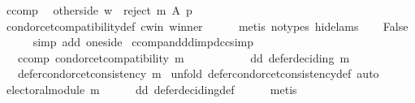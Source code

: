 \begin{isabellebody}
\ ccomp\ \isamarkupfalse%
\ other{\isacharunderscore}{\kern0pt}side{\isacharcolon}{\kern0pt}\ {\isachardoublequoteopen}w\ {\isasymnotin}\ reject\ m\ A\ p{\isachardoublequoteclose}\isanewline
\ \ \ \ \isamarkupfalse%
\ condorcet{\isacharunderscore}{\kern0pt}compatibility{\isacharunderscore}{\kern0pt}def\ c{\isacharunderscore}{\kern0pt}win\ winner\isanewline
\ \ \ \ \isamarkupfalse%
\ {\isacharparenleft}{\kern0pt}metis\ {\isacharparenleft}{\kern0pt}no{\isacharunderscore}{\kern0pt}types{\isacharcomma}{\kern0pt}\ hide{\isacharunderscore}{\kern0pt}lams{\isacharparenright}{\kern0pt}{\isacharparenright}{\kern0pt}\isanewline
\ \ \isamarkupfalse%
\ False\isanewline
\ \ \ \ \isamarkupfalse%
\ {\isacharparenleft}{\kern0pt}simp\ add{\isacharcolon}{\kern0pt}\ one{\isacharunderscore}{\kern0pt}side{\isacharparenright}{\kern0pt}\isanewline
{}\isamarkupfalse%
%
\endisatagproof
{\isafoldproof}%
%
\isadelimproof
\isanewline
%
\endisadelimproof
\isanewline
{}\isamarkupfalse%
\ ccomp{\isacharunderscore}{\kern0pt}and{\isacharunderscore}{\kern0pt}dd{\isacharunderscore}{\kern0pt}imp{\isacharunderscore}{\kern0pt}dcc{\isacharbrackleft}{\kern0pt}simp{\isacharbrackright}{\kern0pt}{\isacharcolon}{\kern0pt}\isanewline
\ \ \ ccomp{\isacharcolon}{\kern0pt}\ {\isachardoublequoteopen}condorcet{\isacharunderscore}{\kern0pt}compatibility\ m{\isachardoublequoteclose}\ \isanewline
\ \ \ \ \ \ \ \ \ \ dd{\isacharcolon}{\kern0pt}\ {\isachardoublequoteopen}defer{\isacharunderscore}{\kern0pt}deciding\ m{\isachardoublequoteclose}\isanewline
\ \ \ {\isachardoublequoteopen}defer{\isacharunderscore}{\kern0pt}condorcet{\isacharunderscore}{\kern0pt}consistency\ m{\isachardoublequoteclose}\isanewline
%
\isadelimproof
%
\endisadelimproof
%
\isatagproof
{}\isamarkupfalse%
\ {\isacharparenleft}{\kern0pt}unfold\ defer{\isacharunderscore}{\kern0pt}condorcet{\isacharunderscore}{\kern0pt}consistency{\isacharunderscore}{\kern0pt}def{\isacharcomma}{\kern0pt}\ auto{\isacharparenright}{\kern0pt}\isanewline
\ \ \isamarkupfalse%
\ {\isachardoublequoteopen}electoral{\isacharunderscore}{\kern0pt}module\ m{\isachardoublequoteclose}\isanewline
\ \ \ \ \isamarkupfalse%
\ dd\ defer{\isacharunderscore}{\kern0pt}deciding{\isacharunderscore}{\kern0pt}def\isanewline
\ \ \ \ \isamarkupfalse%
\ metis\isanewline
{}\isamarkupfalse%
\isanewline
\ \ \isamarkupfalse%
\isanewline

\end{isabellebody}

